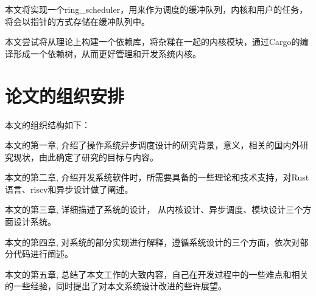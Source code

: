 本文将实现一个ring\_scheduler，用来作为调度的缓冲队列，内核和用户的任务，将会以指针的方式存储在缓冲队列中。

本文尝试将从理论上构建一个依赖库，将杂糅在一起的内核模块，通过Cargo的编译形成一个依赖树，从而更好管理和开发系统内核。

\section{论文的组织安排}

本文的组织结构如下：

本文的第一章, 介绍了操作系统异步调度设计的研究背景，意义，相关的国内外研究现状，由此确定了研究的目标与内容。

本文的第二章, 介绍开发系统软件时，所需要具备的一些理论和技术支持，对Rust语言、riscv和异步设计做了阐述。

本文的第三章, 详细描述了系统的设计， 从内核设计、异步调度、模块设计三个方面设计系统。

本文的第四章, 对系统的部分实现进行解释，遵循系统设计的三个方面，依次对部分代码进行阐述。

本文的第五章, 总结了本文工作的大致内容，自己在开发过程中的一些难点和相关的一些经验，同时提出了对本文系统设计改进的些许展望。
